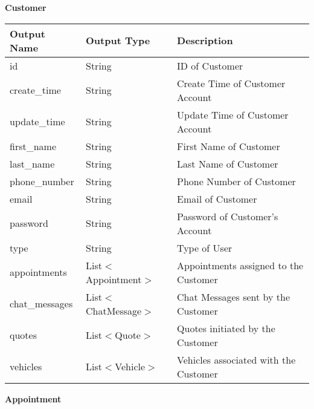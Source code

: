 \documentclass[12pt, titlepage]{article}
\begin{document}
\textbf{Customer}

\begin{table}[H]
	\begin{tabular}{|l|l|l|}
		\hline
		\textbf{Output Name} & \textbf{Output Type}  & \textbf{Description}                  \\
		\hline
		id                   & String                & ID of Customer                        \\
		\hline
		create\_time         & String                & Create Time of Customer Account       \\
		\hline
		update\_time         & String                & Update Time of Customer Account       \\
		\hline
		first\_name          & String                & First Name of Customer                \\
		\hline
		last\_name           & String                & Last Name of Customer                 \\
		\hline
		phone\_number        & String                & Phone Number of Customer              \\
		\hline
		email                & String                & Email of Customer                     \\
		\hline
		password             & String                & Password of Customer's Account        \\
		\hline
		type                 & String                & Type of User                          \\
		\hline
		appointments         & List$<$Appointment$>$ & Appointments assigned to the Customer \\
		\hline
		chat\_messages       & List$<$ChatMessage$>$ & Chat Messages sent by the Customer    \\
		\hline
		quotes               & List$<$Quote$>$       & Quotes initiated by the Customer      \\
		\hline
		vehicles             & List$<$Vehicle$>$     & Vehicles associated with the Customer \\
		\hline
	\end{tabular}
\end{table}

\textbf{Appointment}
\end{document}
